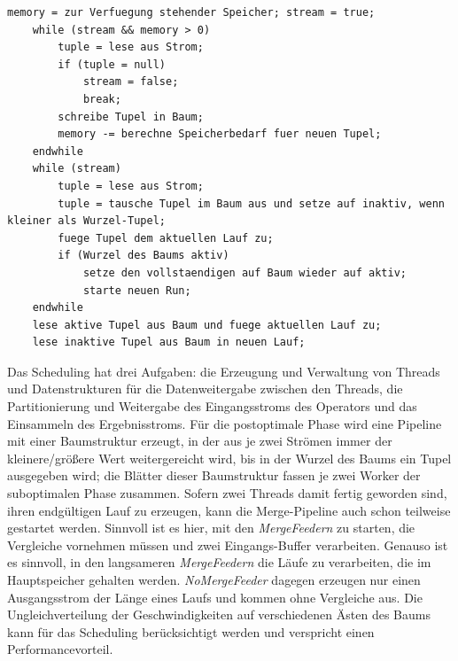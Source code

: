\documentclass[a4paper,12pt,twoside]{article}
\newcommand{\Fb}[1]{\textit{#1}} %
\begin{document}
\begin{minipage}{0.95\textwidth}
	\begin{lstlisting}[caption={Fastsort: Erzeugen der Läufe in der Suboptimalen Phase.}, label=list:fastsortSub]
	memory = zur Verfuegung stehender Speicher; stream = true; 
	while (stream && memory > 0) 
		tuple = lese aus Strom;
		if (tuple = null)
			stream = false;
			break;
		schreibe Tupel in Baum;
		memory -= berechne Speicherbedarf fuer neuen Tupel;
	endwhile
	while (stream)
		tuple = lese aus Strom;
		tuple = tausche Tupel im Baum aus und setze auf inaktiv, wenn kleiner als Wurzel-Tupel;
		fuege Tupel dem aktuellen Lauf zu;
		if (Wurzel des Baums aktiv)
			setze den vollstaendigen auf Baum wieder auf aktiv;
			starte neuen Run;
	endwhile
	lese aktive Tupel aus Baum und fuege aktuellen Lauf zu;
	lese inaktive Tupel aus Baum in neuen Lauf;
	\end{lstlisting}
\end{minipage}

Das Scheduling hat drei Aufgaben: die Erzeugung und Verwaltung von Threads und Datenstrukturen für die Datenweitergabe zwischen den Threads, die Partitionierung und Weitergabe des Eingangsstroms des Operators und das Einsammeln des Ergebnisstroms. Für die postoptimale Phase wird eine Pipeline mit einer Baumstruktur erzeugt, in der aus je zwei Strömen immer der kleinere/größere Wert weitergereicht wird, bis in der Wurzel des Baums ein Tupel ausgegeben wird; die Blätter dieser Baumstruktur fassen je zwei Worker der suboptimalen Phase zusammen. Sofern zwei Threads damit fertig geworden sind, ihren endgültigen Lauf zu erzeugen, kann die Merge-Pipeline auch schon teilweise gestartet werden. Sinnvoll ist es hier, mit den \Fb{MergeFeedern} zu starten, die Vergleiche vornehmen müssen und zwei Eingangs-Buffer verarbeiten. Genauso ist es sinnvoll, in den langsameren \Fb{MergeFeedern} die Läufe zu verarbeiten, die im Hauptspeicher gehalten werden. \Fb{NoMergeFeeder} dagegen erzeugen nur einen Ausgangsstrom der Länge eines Laufs und kommen ohne Vergleiche aus. Die Ungleichverteilung der Geschwindigkeiten auf verschiedenen Ästen des Baums kann für das Scheduling berücksichtigt werden und verspricht einen Performancevorteil.
\end{document}
